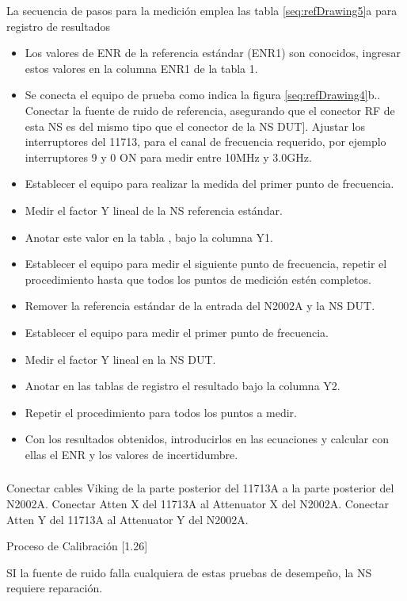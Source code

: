 \documentclass[paper=letter,oneside,fontsize=10pt,parskip=full]{article}
\newcounter{Drawing}
\begin{document}
La secuencia de pasos para la medición emplea las tabla \ref{seq:refDrawing5}a para registro de resultados

\begin{itemize}
\item Los valores de ENR de la referencia estándar (ENR1) son conocidos, ingresar estos valores en la columna ENR1 de la
tabla 1.
\item Se conecta el equipo de prueba como indica la figura \ref{seq:refDrawing4}b.. Conectar la fuente de ruido de
referencia, asegurando que el conector RF de esta NS es del mismo tipo que el conector de la NS DUT]. Ajustar los
interruptores del 11713, para el canal de frecuencia requerido, por ejemplo interruptores 9 y 0 ON para medir entre
10MHz y 3.0GHz. 
\item Establecer el equipo para realizar la medida del primer punto de frecuencia. 
\item Medir el factor Y lineal de la NS referencia estándar.
\item Anotar este valor en la tabla , bajo la columna Y1.
\item Establecer el equipo para medir el siguiente punto de frecuencia, repetir el procedimiento hasta que todos los
puntos de medición estén completos.
\item Remover la referencia estándar de la entrada del N2002A y la NS DUT.
\item Establecer el equipo para medir el primer punto de frecuencia.
\item Medir el factor Y lineal en la NS DUT.
\item Anotar en las tablas de registro el resultado bajo la columna Y2.
\item Repetir el procedimiento para todos los puntos a medir.
\item Con los resultados obtenidos, introducirlos en las ecuaciones y calcular con ellas el ENR y los valores de
incertidumbre.
\end{itemize}
\subsubsection{}
Conectar cables Viking de la parte posterior del 11713A a la parte posterior del N2002A. Conectar Atten X del 11713A al
Attenuator X del N2002A. Conectar Atten Y del 11713A al Attenuator Y del N2002A.

Proceso de Calibración [1.26]

SI la fuente de ruido falla cualquiera de estas pruebas de desempeño, la NS requiere reparación.
\end{document}
